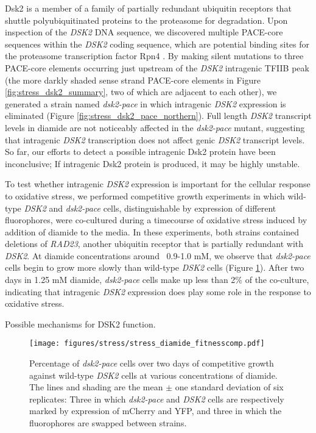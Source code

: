 Dsk2 is a member of a family of partially redundant ubiquitin receptors that shuttle polyubiquitinated proteins to the proteasome for degradation.
Upon inspection of the \textit{DSK2} DNA sequence, we discovered multiple PACE-core sequences within the \textit{DSK2} coding sequence, which are potential binding sites for the proteasome transcription factor Rpn4 \citep{shirozu2015}.
By making silent mutations to three PACE-core elements occurring just upstream of the \textit{DSK2} intragenic TFIIB peak (the more darkly shaded sense strand PACE-core elements in Figure \ref{fig:stress_dsk2_summary}, two of which are adjacent to each other), we generated a strain named \textit{dsk2-pace} in which intragenic \textit{DSK2} expression is eliminated (Figure \ref{fig:stress_dsk2_pace_northern}).
Full length \textit{DSK2} transcript levels in diamide are not noticeably affected in the \textit{dsk2-pace} mutant, suggesting that intragenic \textit{DSK2} transcription does not affect genic \textit{DSK2} transcript levels.
So far, our efforts to detect a possible intragenic Dsk2 protein have been inconclusive; If intragenic Dsk2 protein is produced, it may be highly unstable.

To test whether intragenic \textit{DSK2} expression is important for the cellular response to oxidative stress, we performed competitive growth experiments in which wild-type \textit{DSK2} and \textit{dsk2-pace} cells, distinguishable by expression of different fluorophores, were co-cultured during a timecourse of oxidative stress induced by addition of diamide to the media.
In these experiments, both strains contained deletions of \textit{RAD23}, another ubiquitin receptor that is partially redundant with \textit{DSK2}.
At diamide concentrations around ~0.9-1.0 mM, we observe that \textit{dsk2-pace} cells begin to grow more slowly than wild-type \textit{DSK2} cells (Figure \ref{fig:stress_diamide_fitnesscomp}).
After two days in 1.25 mM diamide, \textit{dsk2-pace} cells make up less than 2\% of the co-culture, indicating that intragenic \textit{DSK2} expression does play some role in the response to oxidative stress.

Possible mechanisms for DSK2 function.

\begin{figure}
    \texttt{[image: figures/stress/stress\_diamide\_fitnesscomp.pdf]}
    \caption[Percentage of \textit{dsk2-pace} cells over two days of competitive growth against wild-type \textit{DSK2} cells at various concentrations of diamide.]{Percentage of \textit{dsk2-pace} cells over two days of competitive growth against wild-type \textit{DSK2} cells at various concentrations of diamide. The lines and shading are the mean $\pm$ one standard deviation of six replicates: Three in which \textit{dsk2-pace} and \textit{DSK2} cells are respectively marked by expression of mCherry and YFP, and three in which the fluorophores are swapped between strains.}
    \label{fig:stress_diamide_fitnesscomp}
\end{figure}

